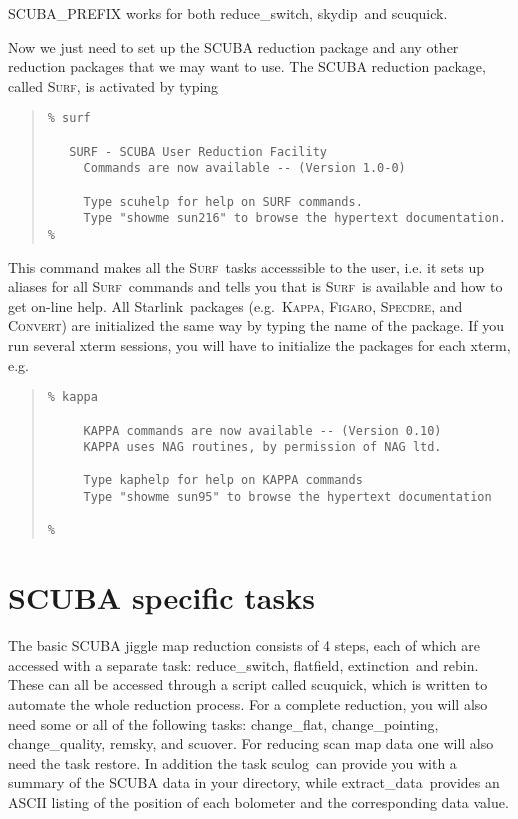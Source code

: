 \documentclass[twoside,11pt]{article}
\newenvironment{myquote}{\begin{quote}\begin{small}}{\end{small}\end{quote}}
\newcommand{\starlink}{\htmladdnormallink{Starlink}{http://star-www.rl.ac.uk/}}
\newcommand{\Kappa}{\xref{\textsc{Kappa}}{sun95}{}}
\newcommand{\Figaro}{\xref{\textsc{Figaro}}{sun86}{}}
\newcommand{\convert}{\xref{\textsc{Convert}}{sun55}{}}
\newcommand{\surf}{\xref{\textsc{Surf}}{sun216}{}}
\newcommand{\Specdre}{\xref{\textsc{Specdre}}{sun140}{}}
\newcommand{\task}[1]{\textsf{#1}}
\newcommand{\rebin}{\xref{\task{rebin}}{sun216}{REBIN}}
\newcommand{\chgqual}{\xref{\task{change\_\-qua\-lity}}{sun216}{CHANGE_QUALITY}}
\newcommand{\chgflat}{\xref{\task{change\_flat}}{sun216}{CHANGE_FLAT}}
\newcommand{\chgpnt}{\xref{\task{change\_pointing}}{sun216}{CHANGE_POINTING}}
\newcommand{\resw}{\xref{\task{reduce\_switch}}{sun216}{REDUCE_SWITCH}}
\newcommand{\flatf}{\xref{\task{flatfield}}{sun216}{FLATFIELD}}
\newcommand{\skydip}{\xref{\task{skydip}}{sun216}{SKYDIP}}
\newcommand{\ext}{\xref{\task{extinction}}{sun216}{EXTINCTION}}
\newcommand{\scuquick}{\xref{\task{scuquick}}{sun216}{SCUQUICK}}
\newcommand{\remsky}{\xref{\task{remsky}}{sun216}{REMSKY}}
\newcommand{\scuover}{\xref{\task{scuover}}{sun216}{SCUOVER}}
\newcommand{\extdata}{\xref{\task{extract\_data}}{sun216}{EXTRACT_DATA}}
\newcommand{\sculog}{\xref{\task{sculog}}{sun216}{SCULOG}}
\newcommand{\restore}{\xref{\task{restore}}{sun216}{RESTORE}}
\newcommand{\htmladdnormallink}[2]{#1}
\newcommand{\xref}[3]{#1}
\newcommand{\xlabel}[1]{}
\begin{document}
SCUBA\_PREFIX works for both \resw, \skydip\ and \scuquick.

Now we just need to set up the SCUBA reduction package and any other
reduction packages that we may want to use. The SCUBA reduction package,
called \surf, is activated by typing

\begin{myquote} \begin{verbatim}
% surf
 
   SURF - SCUBA User Reduction Facility
     Commands are now available -- (Version 1.0-0)
 
     Type scuhelp for help on SURF commands.
     Type "showme sun216" to browse the hypertext documentation. 
%
\end{verbatim} \end{myquote}

This command makes all the \surf\ tasks accesssible to the user,
i.e. it sets up aliases for all \surf\ commands and  tells you that
is \surf\ is available and how to get on-line help. All \starlink\ packages
(e.g.\ \Kappa, \Figaro, \Specdre, and \convert) are initialized the same
way by typing the name of the package. If you run several xterm sessions,
you will have to initialize the packages for each xterm, e.g.

\begin{myquote} \begin{verbatim}
% kappa

     KAPPA commands are now available -- (Version 0.10)
     KAPPA uses NAG routines, by permission of NAG ltd.

     Type kaphelp for help on KAPPA commands
     Type "showme sun95" to browse the hypertext documentation

%
\end{verbatim} \end{myquote}

\section{\xlabel{scuba_specific_tasks}SCUBA specific tasks}

The basic SCUBA jiggle map reduction consists of 4 steps, each of which
are accessed with a separate task: \resw, \flatf,
\ext\ and \rebin. These can all be accessed through a
script called \scuquick, which is written to automate the whole
reduction process. For a complete reduction, you will also need some
or all of the following tasks: \chgflat, \chgpnt,
\chgqual, \remsky, and \scuover. For reducing scan map
data one will also need the task \restore. In addition the task
\sculog\ can provide you with a summary of the SCUBA data in your
directory, while \extdata\ provides an ASCII listing of the position of each
bolometer and the corresponding data value.
\end{document}
